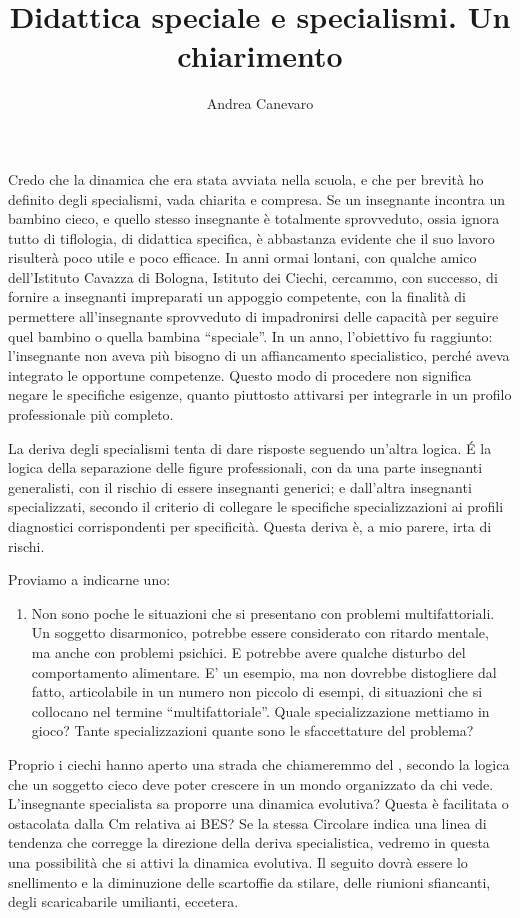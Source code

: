 \author{Andrea Canevaro}
\title{Didattica speciale e specialismi. Un chiarimento}
\label{Canevaro020713}
\maketitle
Credo che la dinamica che era stata avviata nella scuola, e che per brevità ho definito degli specialismi, vada chiarita e compresa. Se un insegnante incontra un bambino cieco, e quello stesso insegnante è totalmente sprovveduto, ossia ignora tutto di tiflologia, di didattica specifica, è abbastanza evidente che il suo lavoro risulterà poco utile e poco efficace. In anni ormai lontani, con qualche amico dell'Istituto Cavazza di Bologna, Istituto dei Ciechi, cercammo, con successo, di fornire a insegnanti impreparati un appoggio competente, con la finalità di permettere all'insegnante sprovveduto di impadronirsi delle capacità per seguire quel bambino o quella bambina “speciale”. In un anno, l'obiettivo fu raggiunto: l'insegnante non aveva più bisogno di un affiancamento specialistico, perché aveva integrato le opportune competenze. Questo modo di procedere non significa negare le specifiche esigenze, quanto piuttosto attivarsi per integrarle in un profilo professionale più completo.

La deriva degli specialismi tenta di dare risposte seguendo un'altra logica. \'{E} la logica della separazione delle figure professionali, con da una parte insegnanti generalisti, con il rischio di essere insegnanti generici; e dall'altra insegnanti specializzati, secondo il criterio di collegare le specifiche specializzazioni ai profili diagnostici corrispondenti per specificità. Questa deriva è, a mio parere, irta di rischi.

Proviamo a indicarne uno:
\begin{enumerate}
	\item Non sono poche le situazioni che si presentano con problemi multifattoriali. Un soggetto disarmonico, potrebbe essere considerato con ritardo mentale, ma anche con problemi psichici. E potrebbe avere qualche disturbo del comportamento alimentare. E’ un esempio, ma non dovrebbe distogliere dal fatto, articolabile in un numero non piccolo di esempi, di situazioni che si collocano nel termine “multifattoriale”. Quale specializzazione mettiamo in gioco? Tante specializzazioni quante sono le sfaccettature del problema?
\end{enumerate}
Proprio i ciechi hanno aperto una strada che chiameremmo del , secondo la logica che un soggetto cieco deve poter crescere in un mondo organizzato da chi vede. L'insegnante specialista sa proporre una dinamica evolutiva? Questa è facilitata o ostacolata dalla Cm relativa ai BES? Se la stessa Circolare indica una linea di tendenza che corregge la direzione della deriva specialistica, vedremo in questa una possibilità che si attivi la dinamica evolutiva. Il seguito dovrà essere lo snellimento e la diminuzione delle scartoffie da stilare, delle riunioni sfiancanti, degli scaricabarile umilianti, eccetera.

